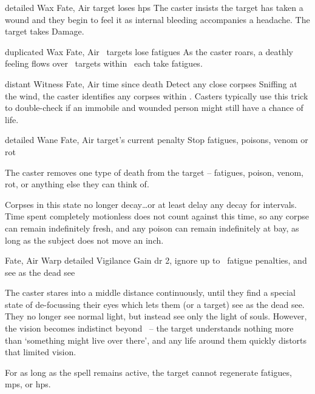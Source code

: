   {detailed}%
  {Wax}%
  {Fate, Air}%
  {}%
  {target loses  \glspl{hp}}%
  {
    The caster insists the target has taken a wound and they begin to feel it as internal bleeding accompanies a headache.
    The target takes  Damage.
  }

  {duplicated}%
  {Wax}%
  {Fate, Air}%
  {}%
  {\spellArea\ targets lose  \glspl{fatigue}}%
  {
    As the caster roars, a deathly feeling flows over \spellArea\ targets within \spellRange\ each take  \glspl{fatigue}.
  }

  {distant}%
  {Witness}%
  {Fate, Air}%
  {time since death}%
  {Detect any close corpses}%
  {
    Sniffing at the wind, the caster identifies any corpses within \spellRange.
    Casters typically use this trick to double-check if an immobile and wounded person might still have a chance of life.
  }

  {detailed}%
  {Wane}%
  {Fate, Air}%
  {target's current  penalty}%
  {Stop \glspl{fatigue}, poisons, venom or rot}%
  {
    The caster removes one type of death from the target -- \glspl{fatigue}, poison, venom, rot, or anything else they can think of.

    Corpses in this state no longer decay\ldots or at least delay any decay for  \glspl{interval}. 
    Time spent completely motionless does not count against this time, so any corpse can remain indefinitely fresh, and any poison can remain indefinitely at bay, as long as the subject does not move an inch.
  }

  {Fate, Air}%
  {Warp}%
  {detailed}%
  {Vigilance}%
  {Gain \gls{dr} 2, ignore up to ~\gls{fatigue} penalties, and see as the dead see}%
  {
    The caster stares into a middle distance continuously, until they find a special state of de-focussing their eyes which lets them (or a target) see as the dead see.
    They no longer see normal light, but instead see only the light of souls.
    However, the vision becomes indistinct beyond \spellRange\ -- the target understands nothing more than `something might live over there', and any life around them quickly distorts that limited vision.

    For as long as the spell remains active, the target cannot regenerate \glspl{fatigue}, \glspl{mp}, or \glspl{hp}.
  }

